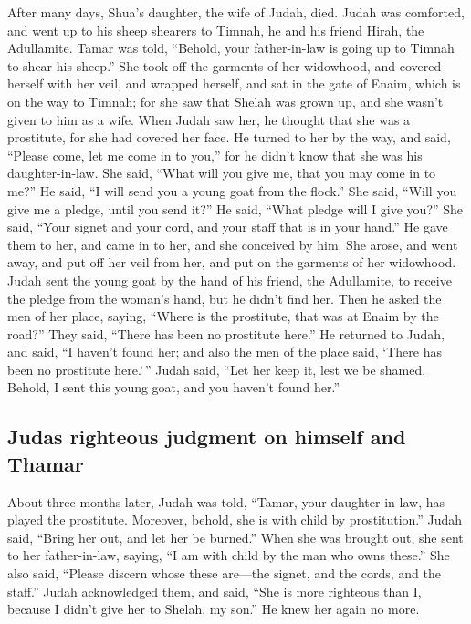  After many days, Shua's daughter, the wife of Judah,
died. Judah was comforted, and went up to his sheep shearers to Timnah,
he and his friend Hirah, the Adullamite.  Tamar was told,
``Behold, your father-in-law is going up to Timnah to shear his sheep.''
 She took off the garments of her widowhood, and covered
herself with her veil, and wrapped herself, and sat in the gate of
Enaim, which is on the way to Timnah; for she saw that Shelah was grown
up, and she wasn't given to him as a wife.  When Judah
saw her, he thought that she was a prostitute, for she had covered her
face.  He turned to her by the way, and said, ``Please
come, let me come in to you,'' for he didn't know that she was his
daughter-in-law. She said, ``What will you give me, that you may come in
to me?''  He said, ``I will send you a young goat from
the flock.'' She said, ``Will you give me a pledge, until you send it?''
 He said, ``What pledge will I give you?'' She said,
``Your signet and your cord, and your staff that is in your hand.'' He
gave them to her, and came in to her, and she conceived by him.
 She arose, and went away, and put off her veil from her,
and put on the garments of her widowhood.  Judah sent the
young goat by the hand of his friend, the Adullamite, to receive the
pledge from the woman's hand, but he didn't find her. 
Then he asked the men of her place, saying, ``Where is the prostitute,
that was at Enaim by the road?'' They said, ``There has been no
prostitute here.''  He returned to Judah, and said, ``I
haven't found her; and also the men of the place said, `There has been
no prostitute here.'\,''  Judah said, ``Let her keep it,
lest we be shamed. Behold, I sent this young goat, and you haven't found
her.''

\hypertarget{judas-righteous-judgment-on-himself-and-thamar}{%
\subsection{Judas righteous judgment on himself and
Thamar}\label{judas-righteous-judgment-on-himself-and-thamar}}

 About three months later, Judah was told, ``Tamar, your
daughter-in-law, has played the prostitute. Moreover, behold, she is
with child by prostitution.'' Judah said, ``Bring her out, and let her
be burned.''  When she was brought out, she sent to her
father-in-law, saying, ``I am with child by the man who owns these.''
She also said, ``Please discern whose these are---the signet, and the
cords, and the staff.''  Judah acknowledged them, and
said, ``She is more righteous than I, because I didn't give her to
Shelah, my son.'' He knew her again no more.

